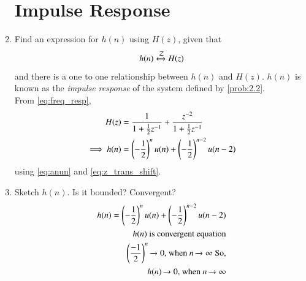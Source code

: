 \documentclass[journal,12pt,twocolumn]{IEEEtran}
\theoremstyle{remark}
\begin{document}
\begin{enumerate}[label=\thesection.\arabic*,ref=\thesection.\theenumi]
\section{Impulse Response}

\item \label{prob:impulse_resp}
Find an expression for $h(n)$ using $H(z)$, given that 
\begin{equation}
\label{eq:impulse_resp}
h(n) \xleftrightarrow{\mathcal{Z}} H(z)
\end{equation}
and there is a one to one relationship between $h(n)$ and $H(z)$. $h(n)$ is known as the {\em impulse response} of the
system defined by \eqref{prob:2.2}.
\\
\solution From \eqref{eq:freq_resp},
\begin{align}
H(z) &= \frac{1}{1 + \frac{1}{2}z^{-1}} + \frac{ z^{-2}}{1 + \frac{1}{2}z^{-1}}
\\
\implies h(n) &= \left(-\frac{1}{2}\right)^{n}u(n) + \left(-\frac{1}{2}\right)^{n-2}u(n-2)
\end{align}
using \eqref{eq:anun} and \eqref{eq:z_trans_shift}.
\item Sketch $h(n)$. Is it bounded? Convergent? 
\\
\solution \begin{align}
h(n) = \left(-\frac{1}{2}\right)^{n}u(n) + \left(-\frac{1}{2}\right)^{n-2}u(n-2)\\
 h(n) \text{ is convergent equation}\\
\left(\frac{-1}{2}\right) ^n \xrightarrow{} 0 \text{, when   }n \xrightarrow{} \infty \text{ So,}\\
h(n) \xrightarrow{} 0\text{, when  } n \xrightarrow{} \infty
\end{align}


\end{enumerate}
\end{document}
